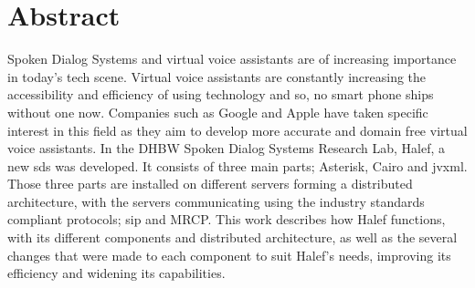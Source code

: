 \chapter*{Abstract}
\label{chap:abstract}
Spoken Dialog Systems and virtual voice assistants are of increasing importance in today's tech scene.
Virtual voice assistants are constantly increasing the accessibility and efficiency of using technology and so, no smart phone ships without one now.
Companies such as Google and Apple have taken specific interest in this field as they aim to develop more accurate and domain free virtual voice assistants.
In the DHBW Spoken Dialog Systems Research Lab, Halef, a new \ac{sds} was developed.
It consists of three main parts; Asterisk, Cairo and \ac{jvxml}.
Those three parts are installed on different servers forming a distributed architecture, with the servers communicating using the industry standards compliant protocols; \ac{sip} and MRCP.
This work describes how Halef functions, with its different components and distributed architecture, as well as the several changes that were made to each component to suit Halef's needs, improving its efficiency and widening its capabilities. 
